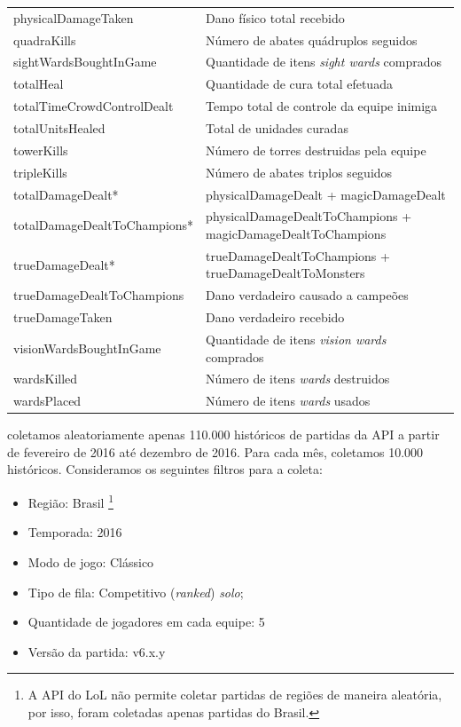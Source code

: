 \begin{table}
\begin{tabular}{p{}p{}}
physicalDamageTaken & Dano físico total recebido\\
quadraKills & Número de abates quádruplos seguidos\\
sightWardsBoughtInGame & Quantidade de itens \textit{sight wards} comprados\\
totalHeal & Quantidade de cura total efetuada\\
totalTimeCrowdControlDealt & Tempo total de controle da equipe inimiga\\
totalUnitsHealed & Total de unidades curadas\\
towerKills & Número de torres destruidas pela equipe\\
tripleKills & Número de abates triplos seguidos\\
totalDamageDealt* & physicalDamageDealt + magicDamageDealt \\
totalDamageDealtToChampions* & physicalDamageDealtToChampions + magicDamageDealtToChampions \\
 trueDamageDealt* & trueDamageDealtToChampions + trueDamageDealtToMonsters\\
trueDamageDealtToChampions & Dano verdadeiro causado a campeões\\
trueDamageTaken & Dano verdadeiro recebido\\
visionWardsBoughtInGame & Quantidade de itens \textit{vision wards} comprados\\
wardsKilled & Número de itens \textit{wards} destruidos\\
wardsPlaced & Número de itens \textit{wards} usados\\
  \bottomrule
\end{tabular}
\end{table}

 coletamos aleatoriamente apenas 110.000 históricos de partidas da API a partir de fevereiro de 2016 até dezembro de 2016. Para cada mês, coletamos 10.000 históricos. Consideramos os seguintes filtros para a coleta: 

\begin{itemize}
  \item Região: Brasil \footnote{A API do LoL não permite coletar partidas de regiões de maneira aleatória, por isso, foram coletadas apenas partidas do Brasil.}
  \item Temporada: 2016
  \item Modo de jogo: Clássico
  \item Tipo de fila: Competitivo (\textit{ranked}) \textit{solo};
  \item Quantidade de jogadores em cada equipe: 5
  \item Versão da partida: v6.x.y
\end{itemize}

